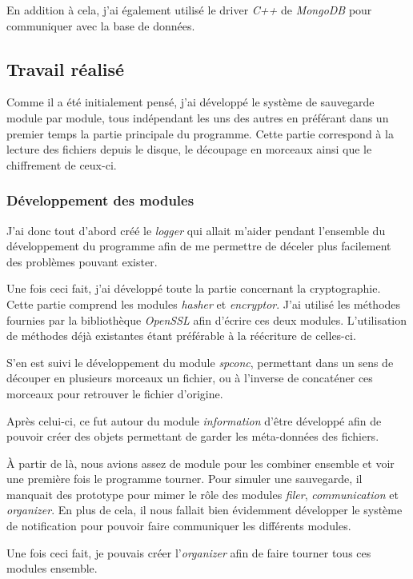 \documentclass[a4paper,10pt, twoside]{report}
\begin{document}
\begin{spacing}{1.2}
En addition \`a cela, j'ai \'egalement utilis\'e le driver \textit{C++} de
\textit{MongoDB} pour communiquer avec la base de donn\'ees.

\subsection{Travail r\'ealis\'e}
Comme il a \'et\'e initialement pens\'e, j'ai d\'evelopp\'e le syst\`eme de
sauvegarde module par module, tous ind\'ependant les uns des autres en
pr\'ef\'erant dans un premier temps la partie principale du programme. Cette
partie correspond \`a la lecture des fichiers depuis le disque, le d\'ecoupage
en morceaux ainsi que le chiffrement de ceux-ci.

\subsubsection{D\'eveloppement des modules}
J'ai donc tout d'abord cr\'e\'e le \textit{logger} qui allait m'aider pendant
l'ensemble du d\'eveloppement du programme afin de me permettre de d\'eceler
plus facilement des probl\`emes pouvant exister.

Une fois ceci fait, j'ai d\'evelopp\'e toute la partie concernant la
cryptographie. Cette partie comprend les modules \textit{hasher} et
\textit{encryptor}. J'ai utilis\'e les m\'ethodes fournies par la biblioth\`eque
\textit{OpenSSL} afin d'\'ecrire ces deux modules. L'utilisation de m\'ethodes
d\'ej\`a existantes \'etant pr\'ef\'erable \`a la r\'e\'ecriture de celles-ci.

S'en est suivi le d\'eveloppement du module \textit{spconc}, permettant dans un
sens de d\'ecouper en plusieurs morceaux un fichier, ou \`a l'inverse de
concat\'ener ces morceaux pour retrouver le fichier d'origine.

Apr\`es celui-ci, ce fut autour du module \textit{information} d'\^etre
d\'evelopp\'e afin de pouvoir cr\'eer des objets permettant de garder les
m\'eta-donn\'ees des fichiers.

\`A partir de l\`a, nous avions assez de module pour les combiner ensemble et
voir une premi\`ere fois le programme tourner. Pour simuler une sauvegarde, il
manquait des prototype pour mimer le r\^ole des modules \textit{filer},
\textit{communication} et \textit{organizer}. En plus de cela, il nous fallait
bien \'evidemment d\'evelopper le syst\`eme de notification pour pouvoir faire
communiquer les diff\'erents modules.

Une fois ceci fait, je pouvais cr\'eer l'\textit{organizer} afin de faire
tourner tous ces modules ensemble.


\end{spacing}
\end{document}
